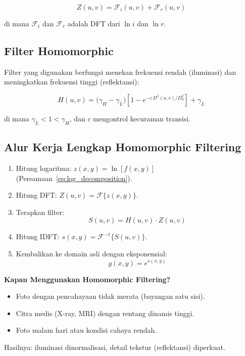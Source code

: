 \documentclass[12pt,a4paper]{article}
\begin{document}
\begin{equation}
  Z(u,v) = \mathcal{F}_i(u,v) + \mathcal{F}_r(u,v)
  \label{eq:freq_decomposition}
\end{equation}

di mana $\mathcal{F}_i$ dan $\mathcal{F}_r$ adalah DFT dari $\ln i$ dan $\ln r$.

\subsection{Filter Homomorphic}

Filter yang digunakan berfungsi menekan frekuensi rendah (iluminasi) dan
meningkatkan frekuensi tinggi (reflektansi):

\begin{equation}
  H(u,v) = \bigl(\gamma_H - \gamma_L\bigr)
            \left[1 - e^{-c\,D^2(u,v)/D_0^2}\right] + \gamma_L
  \label{eq:homo_filter_func}
\end{equation}

di mana $\gamma_L < 1 < \gamma_H$, dan $c$ mengontrol kecuraman transisi.

\subsection{Alur Kerja Lengkap Homomorphic Filtering}

\begin{enumerate}
  \item Hitung logaritma: $z(x,y) = \ln[f(x,y)]$
        (Persamaan~\eqref{eq:log_decomposition}).
  \item Hitung DFT: $Z(u,v) = \mathcal{F}\{z(x,y)\}$.
  \item Terapkan filter:
        \begin{equation}
          S(u,v) = H(u,v) \cdot Z(u,v)
          \label{eq:homo_apply}
        \end{equation}
  \item Hitung IDFT: $s(x,y) = \mathcal{F}^{-1}\{S(u,v)\}$.
  \item Kembalikan ke domain asli dengan eksponensial:
        \begin{equation}
          g(x,y) = e^{s(x,y)}
          \label{eq:homo_exp}
        \end{equation}
\end{enumerate}

\begin{tipbox}
\textbf{Kapan Menggunakan Homomorphic Filtering?}
\begin{itemize}
  \item Foto dengan pencahayaan tidak merata (bayangan satu sisi).
  \item Citra medis (X-ray, MRI) dengan rentang dinamis tinggi.
  \item Foto malam hari atau kondisi cahaya rendah.
\end{itemize}
Hasilnya: iluminasi dinormalisasi, detail tekstur (reflektansi) diperkuat.
\end{tipbox}
\end{document}

